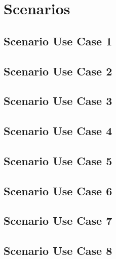 \newpage
\section{Scenarios}

\subsection{Scenario Use Case 1}


\newpage

\subsection{Scenario Use Case 2}


\newpage

\subsection{Scenario Use Case 3}


\newpage

\subsection{Scenario Use Case 4}


\newpage

\subsection{Scenario Use Case 5}


\newpage

\subsection{Scenario Use Case 6}


\newpage

\subsection{Scenario Use Case 7}


\newpage

\subsection{Scenario Use Case 8}

